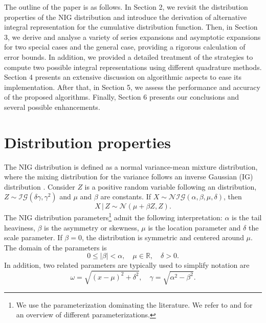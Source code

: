 \documentclass[10pt,a4paper,oneside]{article}
\numberwithin{equation}{section}
\begin{document}
The outline of the paper is as follows. In Section 2, we revisit the distribution properties of the NIG distribution and introduce the derivation of alternative integral representation for the cumulative distribution function. Then, in Section 3, we derive and analyse a variety of series expansions and asymptotic expansions for two special cases and the general case, providing a rigorous calculation of error bounds. In addition, we provided a detailed treatment of the strategies to compute two possible integral representations using different quadrature methods. Section 4 presents an extensive discussion on algorithmic aspects to ease its implementation. After that, in Section 5, we assess the performance and accuracy of the proposed algorithms. Finally, Section 6 presents our conclusions and several possible enhancements.



\section{Distribution properties}

The NIG distribution is defined as a normal variance-mean mixture distribution, where the mixing distribution for the variance follows an inverse Gaussian (IG) distribution \cite{Paolella2007}. Consider $Z$ is a positive random variable following an distribution, $Z \sim \mathcal{IG}(\delta \gamma, \gamma^2)$ and $\mu$ and $\beta$ are constants. If $X \sim \mathcal{NIG}(\alpha, \beta, \mu, \delta)$, then
\begin{equation}
X \,|\, Z \sim \mathcal{N}(\mu + \beta Z, Z).
\end{equation}
The NIG distribution parameters\footnote{We use the parameterization dominating the literature. We refer to \cite{Paolella2007} and \cite{Prause1999} for an overview of different parameterizations.} admit the following interpretation: $\alpha$ is the tail heaviness, $\beta$ is the asymmetry or skewness, $\mu$ is the location parameter and $\delta$ the scale parameter. If $\beta = 0$, the distribution is symmetric and centered around $\mu$. The domain of the parameters is
\begin{equation}
0 \le |\beta| < \alpha, \quad \mu \in \mathbb{R}, \quad \delta  > 0.
\end{equation}
In addition, two related parameters are typically used to simplify notation are
\begin{equation}
\omega = \sqrt{(x-\mu)^2 + \delta^2}, \quad \gamma = \sqrt{\alpha^2 - \beta^2}.
\end{equation}
\end{document}
